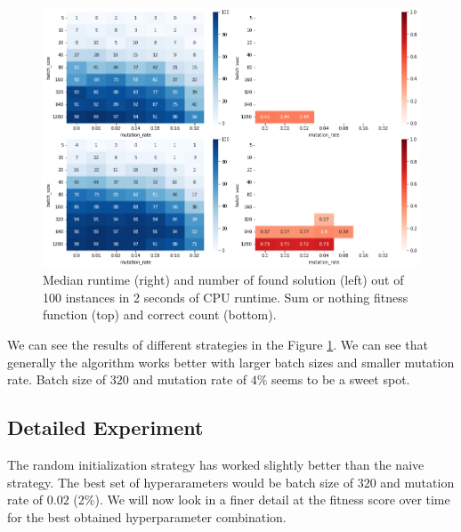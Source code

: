 \documentclass[a4paper,10pt]{article}
\begin{document}
\begin{figure}[!htb]
	\centering
  	\includegraphics[width=\textwidth]{images/pilot_counts_means.png}
	\caption{Median runtime (right) and number of found solution (left) out of 100 instances in 2 seconds of CPU runtime. Sum or nothing fitness function (top) and correct count (bottom).}
	\label{pilot_counts_means}
\end{figure}


We can see the results of different strategies in the Figure \ref{pilot_counts_means}. We can see that generally the algorithm works better with larger batch sizes and smaller mutation rate. Batch size of $320$ and mutation rate of $4 \%$ seems to be a sweet spot.

\subsection{Detailed Experiment}

The random initialization strategy has worked slightly better than the naive strategy. The best set of hyperarameters would be batch size of $320$ and mutation rate of $0.02$ (2\%). We will now look in a finer detail at the fitness score over time for the best obtained hyperparameter combination.
\end{document}
